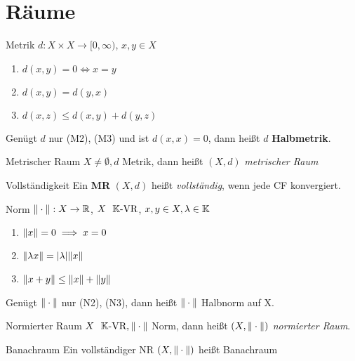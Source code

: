 
\section{Räume}
\begin{definition}{Metrik}
  $d:X \times X \to [0,\infty)$, $x,y \in X$
  \begin{enumerate}[label=(M\arabic*)]
    \item $d(x,y) = 0 \Leftrightarrow x = y$
    \item $d(x,y) = d(y,x)$
    \item $d(x,z) \leq d(x,y) + d(y,z)$
  \end{enumerate}
\end{definition}

Genügt $d$ nur (M2), (M3) und ist $d(x,x) = 0$, dann heißt $d$
\textbf{Halbmetrik}.
\heel

\begin{definition}{Metrischer Raum}
  $X \neq \emptyset, d$ Metrik, dann heißt $(X,d)$ \textit{metrischer Raum}
\end{definition}

\begin{definition}{Vollständigkeit}
  Ein \textbf{MR} $(X,d)$ heißt \textit{vollständig}, wenn jede CF
  konvergiert.
\end{definition}

\begin{definition}{Norm}
  $\|\cdot\|:X\to\mathbb{R}$, $X\ \ \mathbb{K} \text{-VR}$, $x,y \in X, \lambda \in \mathbb{K}$
  \begin{enumerate}[label=(N\arabic*)]
    \item $\|x\| = 0 \implies x = 0$
    \item $\|\lambda x\| = |\lambda|\|x\|$
    \item $\|x+y\| \leq \|x\| + \|y\|$
  \end{enumerate}
\end{definition}

Genügt $\|\cdot\|$ nur (N2), (N3), dann heißt $\|\cdot\|$
Halbnorm auf X.
\heel

\begin{definition}{Normierter Raum}
  $X\ \ \mathbb{K} \text{-VR}, \|\cdot\|$ Norm, dann heißt $(X,\|\cdot\|)$
  \textit{normierter Raum}.
\end{definition}

\begin{definition}{Banachraum}
  Ein vollständiger NR ${(X,\|\cdot\|)}$ heißt Banachraum
\end{definition}

